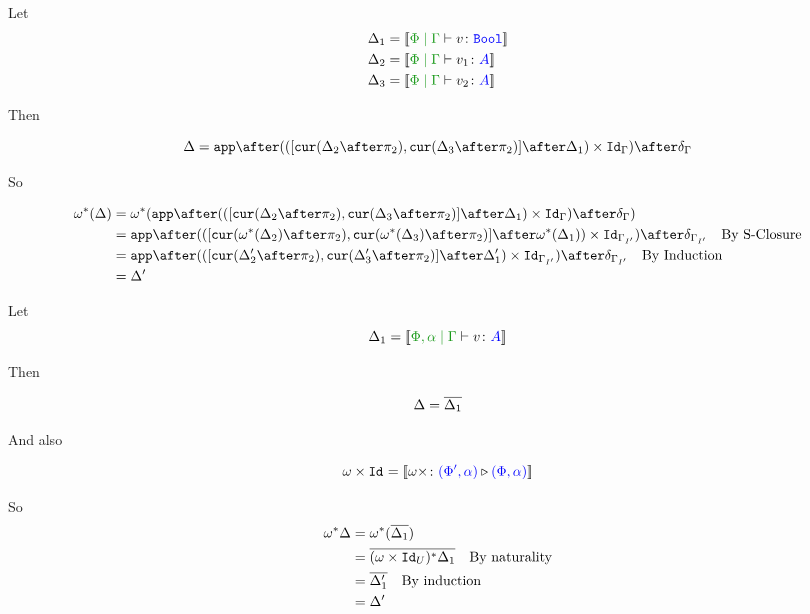 {

Let \begin{align}
    \D_1 &= \deno{\gpetyperelation{v}{\B}}\\
    \D_2 &= \deno{\gpetyperelation{v_1}{A}}\\
    \D_3 &= \deno{\gpetyperelation{v_2}{A}}\\
\end{align}

Then

\begin{equation}
    \D = \app\after(([\cur{\D_2\after\pp}, \cur{\D_3\after\pp}]\after\D_1)\times\Id{\G})\after\diag{\G}\\
\end{equation}

So

\begin{align}
    \w\star(\D) &= \w\star(\app\after(([\cur{\D_2\after\pp}, \cur{\D_3\after\pp}]\after\D_1)\times\Id{\G})\after\diag{\G})\\
    &= \app\after(([\cur{\w\star(\D_2)\after\pp}, \cur{\w\star(\D_3)\after\pp}]\after\w\star(\D_1))\times\Id{\G_{I'}})\after\diag{\G_{I'}}\qt{By S-Closure}\\
    &= \app\after(([\cur{\D_2'\after\pp}, \cur{\D_3'\after\pp}]\after\D_1')\times\Id{\G_{I'}})\after\diag{\G_{I'}}\qt{By Induction}\\
    & = \D'\\
\end{align}



Let \begin{equation}
    \D_1 = \deno{\etyperelation{\P,\a}{\G}{v}{A}}
\end{equation}

Then

\begin{equation}
    \Delta = \overline{\Delta_1}\\
\end{equation}

And also

\begin{equation}
    \omega\times\texttt{Id}_{} = {\bf [\![}\omega\times \colon {\color{blue}(\Phi',\alpha)} \triangleright {\color {blue} (\Phi,\alpha)}{\bf ]\!]}
\end{equation}

So
\begin{align}
    \omega^*\Delta &= \omega^*(\overline{\Delta_1})\\
    & = \overline{(\omega\times\texttt{Id}_{U})^*\Delta_1}\quad\text{By naturality}\\
    & = \overline{\Delta_1'}\quad\text{By induction}\\
    & = \Delta'
\end{align}

}
